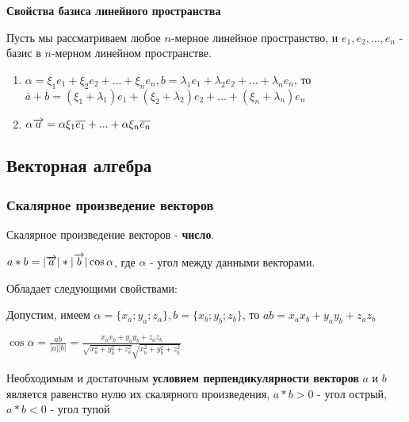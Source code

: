 \documentclass{article}
\def\vec{\ensuremath\overrightarrow}
\begin{document}
\begin{flushleft}
\hfill

\textbf{Свойства базиса линейного пространства}

Пусть мы рассматриваем любое $n$-мерное линейное пространство, и $e_1, e_2, ..., e_n$ - базис в $n$-мерном линейном пространстве.

\begin{enumerate}
    \item $\alpha = \xi_1 e_1 + \xi_2 e_2 + ... + \xi_n e_n, b = \lambda_1 e_1 + \lambda_2 e_2 + ... + \lambda_n e_n$, то $\overline{a} + \overline{b} = (\xi_1 + \lambda_1) e_1 + (\xi_2 + \lambda_2) e_2 + ... + (\xi_n + \lambda_n) e_n$
    \item $\alpha \vec{a} = \alpha \xi_1 \overline{e_1} + ... + \alpha \xi_n \overline{e_n}$
\end{enumerate}

\subsection{Векторная алгебра}

\subsubsection{Скалярное произведение векторов}

Скалярное произведение векторов - \textbf{число}.

\hfill 

$a * b = |\vec{a}| * |\vec{b}| \cos \alpha$, где $\alpha$ - угол между данными векторами.

\hfill

Обладает следующими свойствами:

\begin{multienumerate}
\end{multienumerate}

Допустим, имеем $\alpha = \{ x_a; y_a; z_a \}, b = \{ x_b; y_b; z_b \}$, то $ab = x_a x_b + y_a y_b + z_a z_b$

\hfill

$\cos \alpha = \frac{a b}{|a| |b|} = \frac{x_a x_b + y_a y_b + z_a z_b}{\sqrt{x_a^2 + y_a^2 + z_a^2} \sqrt{x_b^2 + y_b^2 + z_b^2}}$

\hfill

Необходимым и достаточным \textbf{условием перпендикулярности векторов} $a$ и $b$ является равенство нулю их скалярного произведения, $a * b > 0$ - угол острый, $a * b < 0$ - угол тупой


\end{flushleft}
\end{document}

